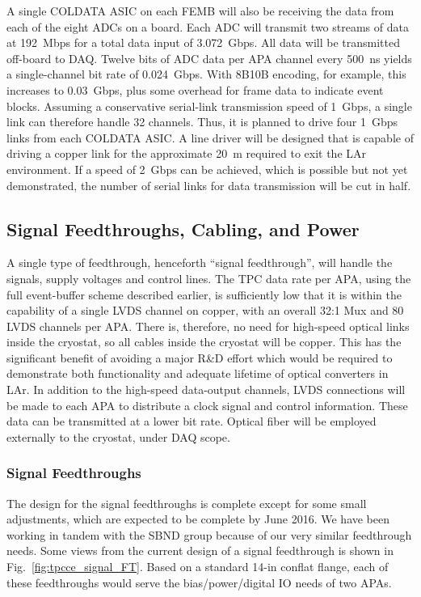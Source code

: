 A single COLDATA ASIC on each FEMB will also be receiving the data from each of the eight ADCs on a board.
Each ADC will transmit two streams of data at 192~Mbps for a total data input of 3.072~Gbps.
All data will be transmitted off-board to DAQ.
Twelve bits of ADC data per APA channel every 500~ns yields a single-channel bit rate of 0.024~Gbps.
With 8B10B encoding, for example, this increases to 0.03~Gbps, plus some overhead for frame data to indicate event blocks.
Assuming a conservative serial-link transmission speed of 1~Gbps, a single link can therefore handle 32 channels.
Thus, it is planned to drive four 1~Gbps links from each COLDATA ASIC.
A line driver will be designed that is capable of driving a copper link for the approximate 20~m required
to exit the LAr environment.
If a speed of 2~Gbps can be achieved, which is possible but not yet demonstrated,
the number of serial links for data transmission will be cut in half.

%
\subsection{Signal Feedthroughs, Cabling, and Power}
\label{subsec:ce_feedthrough}

A single type of feedthrough, henceforth ``signal feedthrough'', will handle the signals, supply voltages and control lines.
The TPC data rate per APA, using the full event-buffer scheme described earlier,
is sufficiently low that it is within the capability of a single LVDS channel on copper,
with an overall 32:1 Mux and 80 LVDS channels per APA.
There is, therefore, no need for high-speed optical links inside the cryostat, so all cables inside the cryostat will be copper.
This has the significant benefit of avoiding a major R\&D effort which would be required to demonstrate
both functionality and adequate lifetime of optical converters in LAr.
In addition to the high-speed data-output channels,
LVDS connections will be made to each APA to distribute a clock signal and control information.
These data can be transmitted at a lower bit rate.
Optical fiber will be employed externally to the cryostat, under DAQ scope.

%
\subsubsection{Signal Feedthroughs }
\label{subsubsec:ce_feedthroughs}

The design for the signal feedthroughs is complete except for some small adjustments,
which are expected to be complete by June 2016.
We have been working in tandem with the SBND group because of our very similar feedthrough needs.
Some views from the current design of a signal feedthrough is shown in Fig.~\ref{fig:tpcce_signal_FT}.
Based on a standard 14-in conflat flange,
each of these feedthroughs would serve the bias/power/digital IO needs of two APAs.  

